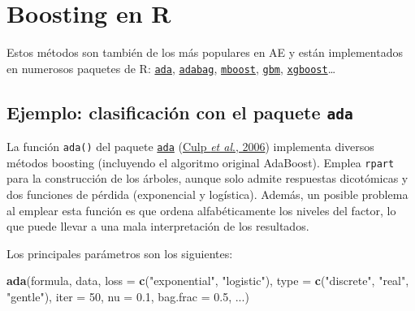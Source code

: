 \documentclass[
]{book}
\newenvironment{Shaded}{\begin{snugshade}}{\end{snugshade}}
\newcommand{\DataTypeTok}[1]{\textcolor[rgb]{0.13,0.29,0.53}{#1}}
\newcommand{\DecValTok}[1]{\textcolor[rgb]{0.00,0.00,0.81}{#1}}
\newcommand{\FloatTok}[1]{\textcolor[rgb]{0.00,0.00,0.81}{#1}}
\newcommand{\KeywordTok}[1]{\textcolor[rgb]{0.13,0.29,0.53}{\textbf{#1}}}
\newcommand{\NormalTok}[1]{#1}
\newcommand{\StringTok}[1]{\textcolor[rgb]{0.31,0.60,0.02}{#1}}
\theoremstyle{break}
\theoremstyle{definition}
\theoremstyle{definition}
\theoremstyle{definition}
\theoremstyle{remark}
\begin{document}
\hypertarget{boosting-en-r}{%
\section{Boosting en R}\label{boosting-en-r}}

Estos métodos son también de los más populares en AE y están implementados en numerosos paquetes de R: \href{https://CRAN.R-project.org/package=ada}{\texttt{ada}}, \href{https://CRAN.R-project.org/package=adabag}{\texttt{adabag}}, \href{https://CRAN.R-project.org/package=mboost}{\texttt{mboost}}, \href{https://CRAN.R-project.org/package=gbm}{\texttt{gbm}}, \href{https://github.com/dmlc/xgboost/tree/master/R-package}{\texttt{xgboost}}\ldots{}

\hypertarget{ejemplo-clasificaciuxf3n-con-el-paquete-ada}{%
\subsection{\texorpdfstring{Ejemplo: clasificación con el paquete \texttt{ada}}{Ejemplo: clasificación con el paquete ada}}\label{ejemplo-clasificaciuxf3n-con-el-paquete-ada}}

La función \texttt{ada()} del paquete \href{https://CRAN.R-project.org/package=ada}{\texttt{ada}} (\href{https://www.jstatsoft.org/article/view/v017i02}{Culp \emph{et al}., 2006}) implementa diversos métodos boosting (incluyendo el algoritmo original AdaBoost).
Emplea \texttt{rpart} para la construcción de los árboles, aunque solo admite respuestas dicotómicas y dos funciones de pérdida (exponencial y logística).
Además, un posible problema al emplear esta función es que ordena alfabéticamente los niveles del factor, lo que puede llevar a una mala interpretación de los resultados.

Los principales parámetros son los siguientes:

\begin{Shaded}
\begin{Highlighting}[]
\KeywordTok{ada}\NormalTok{(formula, data, }\DataTypeTok{loss =} \KeywordTok{c}\NormalTok{(}\StringTok{"exponential"}\NormalTok{, }\StringTok{"logistic"}\NormalTok{),}
    \DataTypeTok{type =} \KeywordTok{c}\NormalTok{(}\StringTok{"discrete"}\NormalTok{, }\StringTok{"real"}\NormalTok{, }\StringTok{"gentle"}\NormalTok{), }\DataTypeTok{iter =} \DecValTok{50}\NormalTok{, }
    \DataTypeTok{nu =} \FloatTok{0.1}\NormalTok{, }\DataTypeTok{bag.frac =} \FloatTok{0.5}\NormalTok{, ...)}
\end{Highlighting}
\end{Shaded}
\end{document}
